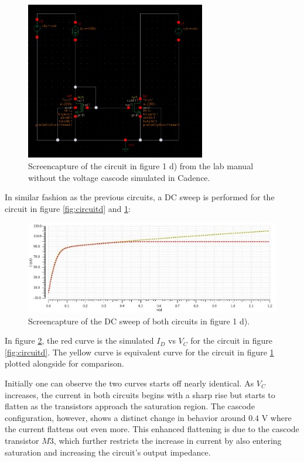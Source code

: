 \documentclass[onecolumn]{article}
\begin{document}
\begin{figure}[h!]
    \centering
    \includegraphics[width=0.7\textwidth]{circuit_d_simple.png}
    \caption{Screencapture of the circuit in figure 1 d) from the lab manual without the voltage cascode simulated in Cadence.}
    \label{fig:circuitdsimple}
\end{figure}

\clearpage

In similar fashion as the previous circuits, a DC sweep is performed for the circuit in figure \ref{fig:circuitd} and \ref{fig:circuitdsimple}:

\begin{figure}[h!]
    \centering
    \includegraphics[width=1\textwidth]{plot_circuit_d_dc_sweep_omskjert.jpg}
    \caption{Screencapture of the DC sweep of both circuits in figure 1 d).}
    \label{fig:plotd}
\end{figure}

In figure \ref{fig:plotd}, the red curve is the simulated $I_D$ vs $V_{C}$ for the circuit in figure \ref{fig:circuitd}. The yellow curve is equivalent curve for the circuit in figure \ref{fig:circuitdsimple} plotted alongside for comparison.  

Initially one can observe the two curves starts off nearly identical. As $V_{C}$ increases, the current in both circuits begins with a sharp rise but starts to flatten as the transistors approach the saturation region. The cascode configuration, however, shows a distinct change in behavior around $0.4$ V where the current flattens out even more. This enhanced flattening is due to the cascode transistor $M3$, which further restricts the increase in current by also entering saturation and increasing the circuit's output impedance.
\end{document}
